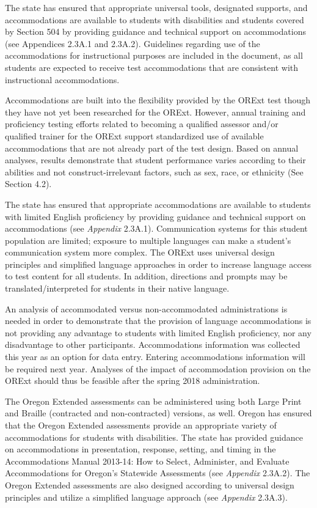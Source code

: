 \documentclass[]{article}
\begin{document}
The state has ensured that appropriate universal tools, designated
supports, and accommodations are available to students with disabilities
and students covered by Section 504 by providing guidance and technical
support on accommodations (see Appendices 2.3A.1 and 2.3A.2). Guidelines
regarding use of the accommodations for instructional purposes are
included in the document, as all students are expected to receive test
accommodations that are consistent with instructional accommodations.

Accommodations are built into the flexibility provided by the ORExt test
though they have not yet been researched for the ORExt. However, annual
training and proficiency testing efforts related to becoming a qualified
assessor and/or qualified trainer for the ORExt support standardized use
of available accommodations that are not already part of the test
design. Based on annual analyses, results demonstrate that student
performance varies according to their abilities and not
construct-irrelevant factors, such as sex, race, or ethnicity (See
Section 4.2).

The state has ensured that appropriate accommodations are available to
students with limited English proficiency by providing guidance and
technical support on accommodations (see \emph{Appendix} 2.3A.1).
Communication systems for this student population are limited; exposure
to multiple languages can make a student's communication system more
complex. The ORExt uses universal design principles and simplified
language approaches in order to increase language access to test content
for all students. In addition, directions and prompts may be
translated/interpreted for students in their native language.

An analysis of accommodated versus non-accommodated administrations is
needed in order to demonstrate that the provision of language
accommodations is not providing any advantage to students with limited
English proficiency, nor any disadvantage to other participants.
Accommodations information was collected this year as an option for data
entry. Entering accommodations information will be required next year.
Analyses of the impact of accommodation provision on the ORExt should
thus be feasible after the spring 2018 administration.

The Oregon Extended assessments can be administered using both Large
Print and Braille (contracted and non-contracted) versions, as well.
Oregon has ensured that the Oregon Extended assessments provide an
appropriate variety of accommodations for students with disabilities.
The state has provided guidance on accommodations in presentation,
response, setting, and timing in the Accommodations Manual 2013-14: How
to Select, Administer, and Evaluate Accommodations for Oregon's
Statewide Assessments (see \emph{Appendix} 2.3A.2). The Oregon Extended
assessments are also designed according to universal design principles
and utilize a simplified language approach (see \emph{Appendix} 2.3A.3).
\end{document}
